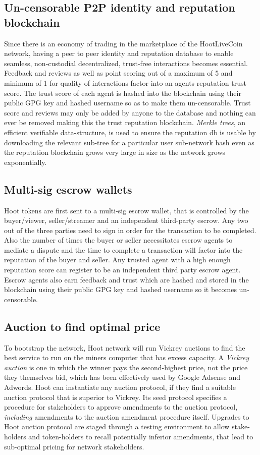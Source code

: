 \documentclass{article}
\begin{document}
\subsection{Un-censorable P2P identity and reputation blockchain}
Since there is an economy of trading in the marketplace of the HootLiveCoin network, having a peer to peer identity and reputation database to enable seamless, non-custodial decentralized, trust-free interactions becomes essential. Feedback and reviews as well as point scoring out of a maximum of 5 and minimum of 1 for quality of interactions factor into an agents reputation trust score. The trust score of each agent is hashed into the blockchain using their public GPG key and hashed username so as to make them un-censorable. Trust score and reviews may only be added by anyone to the database and nothing can ever be removed making this the trust reputation blockchain. \emph{Merkle trees}, an efficient verifiable data-structure, is used to ensure the reputation db is usable by downloading the relevant sub-tree for a particular user sub-network hash even as the reputation blockchain grows very large in size as the network grows exponentially.

\subsection{Multi-sig escrow wallets}
Hoot tokens are first sent to a multi-sig escrow wallet, that is controlled by the buyer/viewer, seller/streamer and an independent third-party escrow. Any
two out of the three parties need to sign in order for the transaction to be completed. Also the number of times the buyer or seller necessitates escrow agents to mediate a dispute and the time to complete a transaction will factor into the reputation of the buyer and seller. Any trusted agent with a high enough reputation score can register to be an independent third party escrow agent. Escrow agents also earn feedback and trust which are hashed and stored in the blockchain using their public GPG key and hashed username so it becomes un-censorable.

\fi

\subsection{Auction to find optimal price}
To bootstrap the network, Hoot network will run Vickrey auctions to find the best service to run on the miners computer that has excess capacity. A \emph{Vickrey auction} is one in which the winner pays the second-highest price, not the price they themselves bid, which has been effectively used by Google Adsense and Adwords.
Hoot can instantiate any auction protocol, if they find a suitable auction protocol that is superior to Vickrey. Its seed protocol specifies a procedure for stakeholders to approve amendments to the auction protocol,
\emph{including} amendments to the auction amendment procedure itself. Upgrades to Hoot auction protocol are staged through a testing environment to allow stake-holders and token-holders to recall potentially inferior amendments, that lead to sub-optimal pricing for network stakeholders. 
\end{document}
